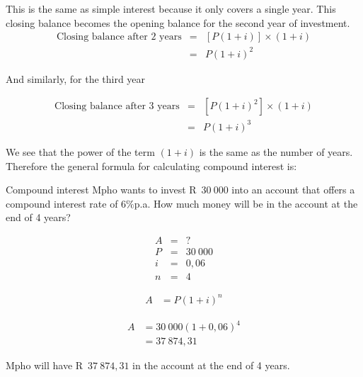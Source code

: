 This is the same as simple interest because it only covers a single year. This closing balance becomes the opening balance for the second year of investment. 
\begin{eqnarray*}
    \text{Closing balance after 2 years} &=& [P(1 + i)] \times (1 + i)\\
    &=& P(1 + i)^2
\end{eqnarray*}

And similarly, for the third year

\begin{eqnarray*}
    \text{Closing balance after 3 years} &=& [P(1 + i)^2] \times (1 + i)\\
    &=& P(1 + i)^3
\end{eqnarray*}

We see that the power of the term $(1 + i)$ is the same as the number of years. Therefore the general formula for calculating compound interest is:




\begin{wex}{Compound interest}{
    Mpho wants to invest R~$30~000$ into an account that offers a compound interest rate of $6\%$p.a. How much money will be in the account at the end of 4 years?}{
    
    \begin{eqnarray*}
	A &=& ?\\
	P &=& 30~000\\
	i &=& 0,06\\
	n &=& 4
    \end{eqnarray*}

    \begin{align*}
	A &= P(1 + i)^n
    \end{align*}

    \begin{align*}
	A &= 30~000(1 + 0,06)^4\\
	  &= 37~874,31
    \end{align*}

    Mpho will have R~$37~874,31$ in the account at the end of 4 years.
    }
\end{wex}


